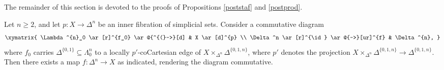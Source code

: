 The remainder of this section is devoted to the proofs of Propositions \ref{poststaf} and
\ref{postprod}.

\begin{lemma}\label{kisker}
Let $n \geq 2$, and let $p: X \rightarrow \Delta^{n}$ be an inner fibration of simplicial sets. Consider a commutative diagram
$$ \xymatrix{ \Lambda^{n}_0 \ar[r]^{f_0} \ar@{^{(}->}[d] & X \ar[d]^{p} \\
\Delta^n \ar[r]^{\id} \ar@{-->}[ur]^{f} & \Delta^{n}, }$$
where $f_0$ carries $\Delta^{ \{0,1\} } \subseteq \Lambda^n_0$ to a locally $p'$-coCartesian edge
of $X \times_{ \Delta^n} \Delta^{ \{0,1,n\}}$, where $p'$ denotes the projection
$X \times_{ \Delta^n} \Delta^{ \{0,1,n\} } \rightarrow \Delta^{ \{0,1,n\} }$. 
Then there exists a map $f: \Delta^n \rightarrow X$ as indicated, rendering the diagram commutative.
\end{lemma}

